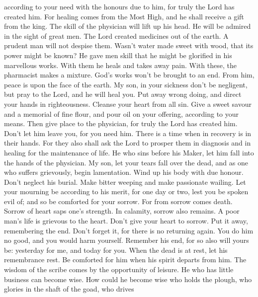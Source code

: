 according to your need with the honours due to him, for truly the Lord
has created him.  For healing comes from the Most High, and
he shall receive a gift from the king.  The skill of the
physician will lift up his head. He will be admired in the sight of
great men.  The Lord created medicines out of the earth. A
prudent man will not despise them.  Wasn't water made sweet
with wood, that its power might be known?  He gave men skill
that he might be glorified in his marvellous works.  With
them he heals and takes away pain.  With these, the
pharmacist makes a mixture. God's works won't be brought to an end. From
him, peace is upon the face of the earth.  My son, in your
sickness don't be negligent, but pray to the Lord, and he will heal you.
 Put away wrong doing, and direct your hands in
righteousness. Cleanse your heart from all sin.  Give a
sweet savour and a memorial of fine flour, and pour oil on your
offering, according to your means.  Then give place to the
physician, for truly the Lord has created him. Don't let him leave you,
for you need him.  There is a time when in recovery is in
their hands.  For they also shall ask the Lord to prosper
them in diagnosis and in healing for the maintenance of life.
 He who sins before his Maker, let him fall into the hands
of the physician.  My son, let your tears fall over the
dead, and as one who suffers grievously, begin lamentation. Wind up his
body with due honour. Don't neglect his burial.  Make
bitter weeping and make passionate wailing. Let your mourning be
according to his merit, for one day or two, lest you be spoken evil of;
and so be comforted for your sorrow.  For from sorrow comes
death. Sorrow of heart saps one's strength.  In calamity,
sorrow also remains. A poor man's life is grievous to the heart.
 Don't give your heart to sorrow. Put it away, remembering
the end.  Don't forget it, for there is no returning again.
You do him no good, and you would harm yourself.  Remember
his end, for so also will yours be: yesterday for me, and today for you.
 When the dead is at rest, let his remembrance rest. Be
comforted for him when his spirit departs from him.  The
wisdom of the scribe comes by the opportunity of leisure. He who has
little business can become wise.  How could he become wise
who holds the plough, who glories in the shaft of the goad, who drives
